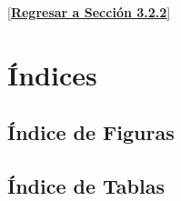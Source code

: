 \documentclass[12pt,a4paper]{report}
\numberwithin{figure}{section}
\begin{document}
\vspace{1em}
\begin{center}
\hyperref[lst:openai-service-ref]{[\textbf{Regresar a Sección 3.2.2}]}
\end{center}

\newpage
\chapter*{Índices}

\section*{Índice de Figuras}
\listoffigures

\newpage
\section*{Índice de Tablas}
\listoftables
\end{document}
